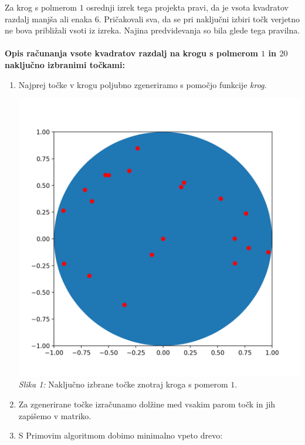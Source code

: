 \documentclass[a4paper]{report}
\begin{document}
Za krog s polmerom $1$ osrednji izrek tega projekta pravi, da je vsota kvadratov razdalj manjša ali enaka $6$. Pričakovali sva, da se pri naključni izbiri točk verjetno ne bova približali vsoti iz izreka. Najina predvidevanja so bila glede tega pravilna. \\ \\
\textbf{Opis računanja vsote kvadratov razdalj na krogu s polmerom $1$ in $20$ naključno izbranimi točkami:}
\begin{enumerate}
\item Najprej točke v krogu poljubno zgeneriramo s pomočjo funkcije \textit{krog}.
\begin{center}
\includegraphics[scale = 0.3]{slikatockekrog}\\ 
\scriptsize{\textit{Slika 1: } Naključno izbrane točke znotraj kroga s pomerom $1$.}
\end{center}
\item Za zgenerirane točke izračunamo dolžine med vsakim parom točk in jih zapišemo v matriko. 
\item S Primovim algoritmom dobimo minimalno vpeto drevo:
\begin{center}

\end{center}
\end{enumerate}
\end{document}
